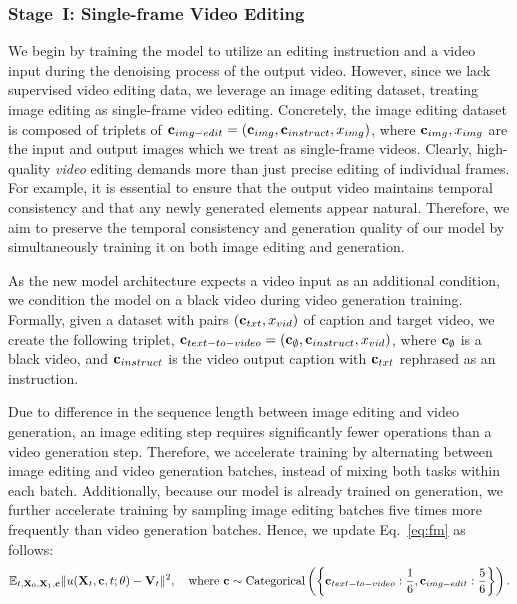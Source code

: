 \subsubsection{Stage~I: Single-frame Video Editing}
\label{subsec:edit_stage_1}
We begin by training the model to utilize an editing instruction and a video input during the denoising process of the output video.
However, since we lack supervised video editing data, we leverage an image editing dataset, treating image editing as single-frame video editing.
Concretely, the image editing dataset is composed of triplets of $\mathbf{c}_{img-edit}=(\mathbf{c}_{img}, \mathbf{c}_{instruct}, x_{img})$, where $\mathbf{c}_{img},x_{img}$ are the input and output images which we treat as single-frame videos.
Clearly, high-quality \textit{video} editing demands more than just precise editing of individual frames.
For example, it is essential to ensure that the output video maintains temporal consistency and that any newly generated elements appear natural.
Therefore, we aim to preserve the temporal consistency and generation quality of our model by simultaneously training it on both image editing and \textToV generation.

As the new model architecture expects a video input as an additional condition, we condition the model on a black video during video generation training.
Formally, given a \textToV dataset with pairs $(\mathbf{c}_{txt},x_{vid})$ of caption and target video, we create the following triplet, $\mathbf{c}_{text-to-video} = (\mathbf{c}_{\emptyset}, \mathbf{c}_{instruct}, x_{vid})$, where $\mathbf{c}_{\emptyset}$ is a black video, and $\mathbf{c}_{instruct}$ is the video output caption with $\mathbf{c}_{txt}$ rephrased as an instruction.

Due to difference in the sequence length between image editing and video generation, an image editing step requires significantly fewer operations than a video generation step.
Therefore, we accelerate training by alternating between image editing and video generation batches, instead of mixing both tasks within each batch.
Additionally, because our model is already trained on \textToV generation, we further accelerate training by sampling image editing batches five times more frequently than video generation batches.
Hence, we update Eq.~\ref{eq:fm} as follows:
\begin{equation}
\label{eq:fm_v2v_stage1}
\mathbb{E}_{t, \mathbf{X}_0, \mathbf{X}_1, \mathbf{c}}\|u(\mathbf{X}_{t}, \mathbf{c}, t; \theta) - \mathbf{V}_t\|^2, \quad \text{where } \mathbf{c} \sim \text{Categorical}\left( \left\{ \mathbf{c}_{text-to-video}: \frac{1}{6}, \mathbf{c}_{img-edit}: \frac{5}{6} \right\} \right).
\end{equation}

